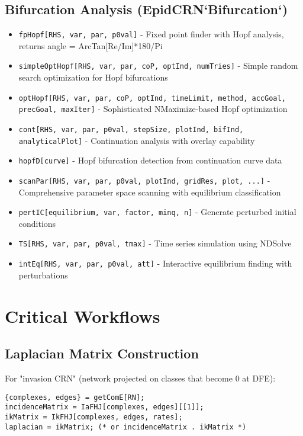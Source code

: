 \documentclass{article}
\begin{document}
\subsection{Bifurcation Analysis (EpidCRN`Bifurcation`)}

\begin{itemize}
\item \texttt{fpHopf[RHS, var, par, p0val]} - Fixed point finder with Hopf analysis, returns angle = ArcTan[Re/Im]*180/Pi
\item \texttt{simpleOptHopf[RHS, var, par, coP, optInd, numTries]} - Simple random search optimization for Hopf bifurcations
\item \texttt{optHopf[RHS, var, par, coP, optInd, timeLimit, method, accGoal, precGoal, maxIter]} - Sophisticated NMaximize-based Hopf optimization
\item \texttt{cont[RHS, var, par, p0val, stepSize, plotInd, bifInd, analyticalPlot]} - Continuation analysis with overlay capability
\item \texttt{hopfD[curve]} - Hopf bifurcation detection from continuation curve data
\item \texttt{scanPar[RHS, var, par, p0val, plotInd, gridRes, plot, ...]} - Comprehensive parameter space scanning with equilibrium classification
\item \texttt{pertIC[equilibrium, var, factor, minq, n]} - Generate perturbed initial conditions
\item \texttt{TS[RHS, var, par, p0val, tmax]} - Time series simulation using NDSolve
\item \texttt{intEq[RHS, var, par, p0val, att]} - Interactive equilibrium finding with perturbations
\end{itemize}

\section{Critical Workflows}

\subsection{Laplacian Matrix Construction}
For "invasion CRN" (network projected on classes that become 0 at DFE):

\begin{lstlisting}
{complexes, edges} = getComE[RN];
incidenceMatrix = IaFHJ[complexes, edges][[1]];
ikMatrix = IkFHJ[complexes, edges, rates];
laplacian = ikMatrix; (* or incidenceMatrix . ikMatrix *)
\end{lstlisting}
\end{document}
